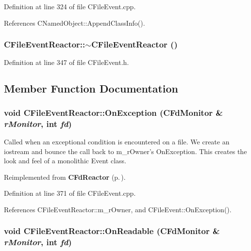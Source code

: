 Definition at line 324 of file CFile\-Event.cpp.

References CNamed\-Object::Append\-Class\-Info().
\subsubsection{\setlength{\rightskip}{0pt plus 5cm}CFile\-Event\-Reactor::$\sim$CFile\-Event\-Reactor ()\hspace{0.3cm}{\tt  [inline]}}\label{classCFileEvent_1_1CFileEventReactor_a1}




Definition at line 347 of file CFile\-Event.h.

\subsection{Member Function Documentation}
\subsubsection{\setlength{\rightskip}{0pt plus 5cm}void CFile\-Event\-Reactor::On\-Exception ({\bf CFd\-Monitor} \& {\em r\-Monitor}, int {\em fd})\hspace{0.3cm}{\tt  [virtual]}}\label{classCFileEvent_1_1CFileEventReactor_a4}


Called when an exceptional condition is encountered on a file. We create an iostream and bounce the call back to m\_\-r\-Owner's On\-Exception. This  creates the look and feel of a monolithic Event class. 

Reimplemented from {\bf CFd\-Reactor} {\rm (p.\,\pageref{classCFdReactor_a8})}.

Definition at line 371 of file CFile\-Event.cpp.

References CFile\-Event\-Reactor::m\_\-r\-Owner, and CFile\-Event::On\-Exception().
\subsubsection{\setlength{\rightskip}{0pt plus 5cm}void CFile\-Event\-Reactor::On\-Readable ({\bf CFd\-Monitor} \& {\em r\-Monitor}, int {\em fd})\hspace{0.3cm}{\tt  [virtual]}}\label{classCFileEvent_1_1CFileEventReactor_a2}


